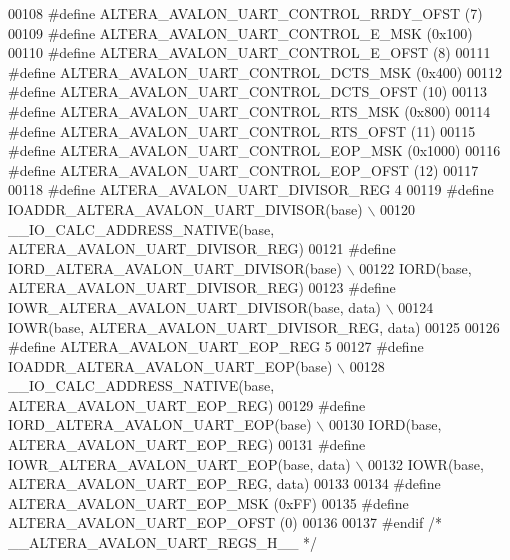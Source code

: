 \begin{DoxyCode}
00108 \textcolor{preprocessor}{#define ALTERA\_AVALON\_UART\_CONTROL\_RRDY\_OFST          (7)}
00109 \textcolor{preprocessor}{#define ALTERA\_AVALON\_UART\_CONTROL\_E\_MSK              (0x100)}
00110 \textcolor{preprocessor}{#define ALTERA\_AVALON\_UART\_CONTROL\_E\_OFST             (8)}
00111 \textcolor{preprocessor}{#define ALTERA\_AVALON\_UART\_CONTROL\_DCTS\_MSK           (0x400)}
00112 \textcolor{preprocessor}{#define ALTERA\_AVALON\_UART\_CONTROL\_DCTS\_OFST          (10)}
00113 \textcolor{preprocessor}{#define ALTERA\_AVALON\_UART\_CONTROL\_RTS\_MSK            (0x800)}
00114 \textcolor{preprocessor}{#define ALTERA\_AVALON\_UART\_CONTROL\_RTS\_OFST           (11)}
00115 \textcolor{preprocessor}{#define ALTERA\_AVALON\_UART\_CONTROL\_EOP\_MSK            (0x1000)}
00116 \textcolor{preprocessor}{#define ALTERA\_AVALON\_UART\_CONTROL\_EOP\_OFST           (12)}
00117 
00118 \textcolor{preprocessor}{#define ALTERA\_AVALON\_UART\_DIVISOR\_REG                4}
00119 \textcolor{preprocessor}{#define IOADDR\_ALTERA\_AVALON\_UART\_DIVISOR(base)       \(\backslash\)}
00120 \textcolor{preprocessor}{        \_\_IO\_CALC\_ADDRESS\_NATIVE(base, ALTERA\_AVALON\_UART\_DIVISOR\_REG)}
00121 \textcolor{preprocessor}{#define IORD\_ALTERA\_AVALON\_UART\_DIVISOR(base)         \(\backslash\)}
00122 \textcolor{preprocessor}{        IORD(base, ALTERA\_AVALON\_UART\_DIVISOR\_REG) }
00123 \textcolor{preprocessor}{#define IOWR\_ALTERA\_AVALON\_UART\_DIVISOR(base, data)   \(\backslash\)}
00124 \textcolor{preprocessor}{        IOWR(base, ALTERA\_AVALON\_UART\_DIVISOR\_REG, data)}
00125 
00126 \textcolor{preprocessor}{#define ALTERA\_AVALON\_UART\_EOP\_REG                    5}
00127 \textcolor{preprocessor}{#define IOADDR\_ALTERA\_AVALON\_UART\_EOP(base)           \(\backslash\)}
00128 \textcolor{preprocessor}{        \_\_IO\_CALC\_ADDRESS\_NATIVE(base, ALTERA\_AVALON\_UART\_EOP\_REG)}
00129 \textcolor{preprocessor}{#define IORD\_ALTERA\_AVALON\_UART\_EOP(base)             \(\backslash\)}
00130 \textcolor{preprocessor}{        IORD(base, ALTERA\_AVALON\_UART\_EOP\_REG)}
00131 \textcolor{preprocessor}{#define IOWR\_ALTERA\_AVALON\_UART\_EOP(base, data)       \(\backslash\)}
00132 \textcolor{preprocessor}{        IOWR(base, ALTERA\_AVALON\_UART\_EOP\_REG, data)}
00133 
00134 \textcolor{preprocessor}{#define ALTERA\_AVALON\_UART\_EOP\_MSK                    (0xFF)}
00135 \textcolor{preprocessor}{#define ALTERA\_AVALON\_UART\_EOP\_OFST                   (0)}
00136 
00137 \textcolor{preprocessor}{#endif }\textcolor{comment}{/* \_\_ALTERA\_AVALON\_UART\_REGS\_H\_\_ */}\textcolor{preprocessor}{}
\end{DoxyCode}
